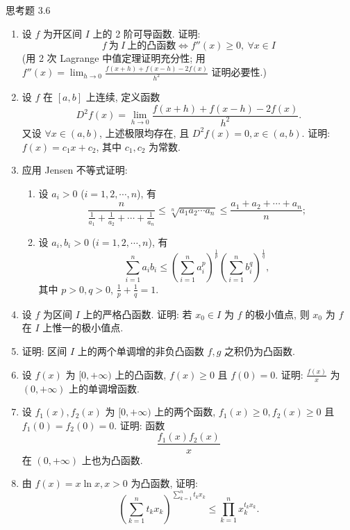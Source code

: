 \begin{exblock}{思考题 3.6}
\begin{enumerate}
  \item 设 $f$ 为开区间 $I$ 上的 2 阶可导函数. 证明:
  \[
  f\ \text{为}\ I\ \text{上的凸函数}\Longleftrightarrow f''(x)\geqslant 0,\ \forall x\in I
\]
  (用 2 次 Lagrange 中值定理证明充分性; 用 $f''(x)=\lim_{h\to 0}\frac{f(x+h)+f(x-h)-2f(x)}{h^2}$ 证明必要性.)

  \item 设 $f$ 在 $[a,b]$ 上连续, 定义函数
  \[
  D^{2}f(x)=\lim_{h\to 0}\frac{f(x+h)+f(x-h)-2f(x)}{h^{2}}.
\]
  又设 $\forall x\in(a,b)$, 上述极限均存在, 且 $D^{2}f(x)=0, x\in(a,b)$. 证明: $f(x)=c_{1}x+c_{2}$, 其中 $c_{1},c_{2}$ 为常数.

  \item 应用 Jensen 不等式证明:
  \begin{enumerate}[label=(\arabic*)]
    \item 设 $a_{i}>0$ ($i=1,2,\cdots,n$), 有
    \[
    \frac{n}{\frac{1}{a_{1}}+\frac{1}{a_{2}}+\cdots+\frac{1}{a_{n}}}\leqslant\sqrt[n]{a_{1}a_{2}\cdots a_{n}}\leqslant\frac{a_{1}+a_{2}+\cdots+a_{n}}{n};
\]
    \item 设 $a_{i},b_{i}>0$ ($i=1,2,\cdots,n$), 有
    \[
    \sum_{i=1}^{n}a_{i}b_{i}\leqslant\left(\sum_{i=1}^{n}a_{i}^{p}\right)^{\frac{1}{p}}\left(\sum_{i=1}^{n}b_{i}^{q}\right)^{\frac{1}{q}},
\]
    其中 $p>0, q>0$, $\frac{1}{p}+\frac{1}{q}=1$.
  \end{enumerate}

  \item 设 $f$ 为区间 $I$ 上的严格凸函数. 证明: 若 $x_{0}\in I$ 为 $f$ 的极小值点, 则 $x_{0}$ 为 $f$ 在 $I$ 上惟一的极小值点.

  \item 证明: 区间 $I$ 上的两个单调增的非负凸函数 $f,g$ 之积仍为凸函数.

  \item 设 $f(x)$ 为 $[0,+\infty)$ 上的凸函数, $f(x)\geqslant 0$ 且 $f(0)=0$. 证明: $\frac{f(x)}{x}$ 为 $(0,+\infty)$ 上的单调增函数.

  \item 设 $f_{1}(x),f_{2}(x)$ 为 $[0,+\infty)$ 上的两个函数, $f_{1}(x)\geqslant 0, f_{2}(x)\geqslant 0$ 且 $f_{1}(0)=f_{2}(0)=0$. 证明: 函数
  \[
  \frac{f_{1}(x)f_{2}(x)}{x}
\]
  在 $(0,+\infty)$ 上也为凸函数.

  \item 由 $f(x)=x\ln x, x>0$ 为凸函数, 证明:
  \[
  \left(\sum_{k=1}^{n}t_{k}x_{k}\right)^{\sum_{k=1}^{n}t_{k}x_{k}}\leqslant\prod_{k=1}^{n}x_{k}^{t_{k}x_{k}}.
\]
\end{enumerate}
\end{exblock}
